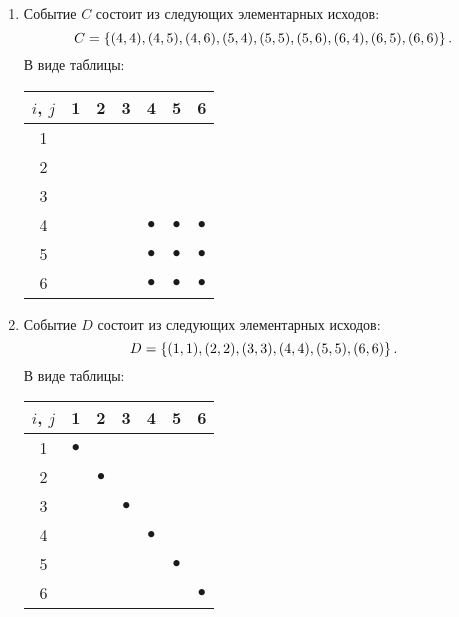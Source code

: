 \begin{enumerate}
    \item
    Событие $C$ состоит из следующих элементарных исходов:
    \begin{equation}
        C = \left \{ (4,4), (4,5), (4,6), (5,4), (5,5), (5,6), (6,4), (6,5), (6,6) \right \} .
    \end{equation}
    В виде таблицы:
    \begin{center}
        \begin{tabular}{c|c|c|c|c|c|c|}
            $i$, $j$ & 1 & 2 & 3 & 4         & 5         & 6         \\
            \hline
            1        &   &   &   &           &           &           \\
            \hline
            2        &   &   &   &           &           &           \\
            \hline
            3        &   &   &   &           &           &           \\
            \hline
            4        &   &   &   & $\bullet$ & $\bullet$ & $\bullet$ \\
            \hline
            5        &   &   &   & $\bullet$ & $\bullet$ & $\bullet$ \\
            \hline
            6        &   &   &   & $\bullet$ & $\bullet$ & $\bullet$ \\
            \hline
        \end{tabular}
    \end{center}

    \item
    Событие $D$ состоит из следующих элементарных исходов:
    \begin{equation}
        D = \left \{ (1,1), (2,2), (3,3), (4,4), (5,5), (6,6) \right \} .
    \end{equation}
    В виде таблицы:
    \begin{center}
        \begin{tabular}{c|c|c|c|c|c|c|}
            $i$, $j$ & 1         & 2         & 3         & 4         & 5         & 6         \\
            \hline
            1        & $\bullet$ &           &           &           &           &           \\
            \hline
            2        &           & $\bullet$ &           &           &           &           \\
            \hline
            3        &           &           & $\bullet$ &           &           &           \\
            \hline
            4        &           &           &           & $\bullet$ &           &           \\
            \hline
            5        &           &           &           &           & $\bullet$ &           \\
            \hline
            6        &           &           &           &           &           & $\bullet$ \\
            \hline
        \end{tabular}
    \end{center}
\end{enumerate}

